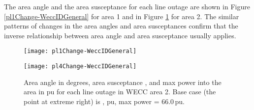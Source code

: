 \documentclass[conference]{IEEEtran}
\begin{document}
{{  The area angle and the area susceptance for each line outage are shown in Figure \ref{pl1Change-WeccIDGeneral} for area 1 and in Figure \ref{pl4Change-WeccIDGeneral} for area 2. 
    The similar patterns of changes in the area angles and area susceptances confirm that the inverse relationship between area angle and area susceptance usually applies. 

  
  \begin{figure}[h]
  \begin{center}
  \texttt{[image: pl1Change-WeccIDGeneral]}
  \vspace{-25pt}
   \caption{Area angle  in degrees, area susceptance  , and maximum power into the area in pu for each line outage in WECC area 1. Base case (the point at extreme right) is , pu, max power  = 46.9.
   For clarity, graph shows  multiplied by 2, and max power  multiplied by 1.5.}
  \label{pl1Change-WeccIDGeneral}
  \end{center}
\begin{center}
  \texttt{[image: pl4Change-WeccIDGeneral]}
  \vspace{-25pt}
   \caption{Area angle  in degrees, area susceptance , and max power into the area in pu for each line outage in WECC area 2. Base case (the point at extreme right) is , pu, max power  = 66.0\,pu.}  \label{pl4Change-WeccIDGeneral}
  \end{center}
  \end{figure} 
  
}}
\end{document}
